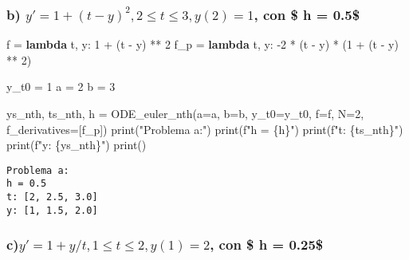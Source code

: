 \documentclass[
  letterpaper,
  DIV=11,
  numbers=noendperiod]{scrartcl}
\newenvironment{Shaded}{\begin{snugshade}}{\end{snugshade}}
\newcommand{\BuiltInTok}[1]{\textcolor[rgb]{0.00,0.23,0.31}{#1}}
\newcommand{\DecValTok}[1]{\textcolor[rgb]{0.68,0.00,0.00}{#1}}
\newcommand{\KeywordTok}[1]{\textcolor[rgb]{0.00,0.23,0.31}{\textbf{#1}}}
\newcommand{\NormalTok}[1]{\textcolor[rgb]{0.00,0.23,0.31}{#1}}
\newcommand{\OperatorTok}[1]{\textcolor[rgb]{0.37,0.37,0.37}{#1}}
\newcommand{\SpecialCharTok}[1]{\textcolor[rgb]{0.37,0.37,0.37}{#1}}
\newcommand{\SpecialStringTok}[1]{\textcolor[rgb]{0.13,0.47,0.30}{#1}}
\newcommand{\StringTok}[1]{\textcolor[rgb]{0.13,0.47,0.30}{#1}}
\begin{document}
\subsubsection{\texorpdfstring{b)
\(y' =1+(t-y)^2,2 \leq t \leq 3,  y(2) = 1\), con \$ h =
0.5\$}{b) y\textquotesingle{} =1+(t-y)\^{}2,2 \textbackslash leq t \textbackslash leq 3,  y(2) = 1, con \$ h = 0.5\$}}\label{b-y-1t-y22-leq-t-leq-3-y2-1-con-h-0.5}

\begin{Shaded}
\begin{Highlighting}[]
\NormalTok{f }\OperatorTok{=} \KeywordTok{lambda}\NormalTok{ t, y: }\DecValTok{1} \OperatorTok{+}\NormalTok{ (t }\OperatorTok{{-}}\NormalTok{ y) }\OperatorTok{**} \DecValTok{2}
\NormalTok{f\_p }\OperatorTok{=} \KeywordTok{lambda}\NormalTok{ t, y: }\OperatorTok{{-}}\DecValTok{2} \OperatorTok{*}\NormalTok{ (t }\OperatorTok{{-}}\NormalTok{ y) }\OperatorTok{*}\NormalTok{ (}\DecValTok{1} \OperatorTok{+}\NormalTok{ (t }\OperatorTok{{-}}\NormalTok{ y) }\OperatorTok{**} \DecValTok{2}\NormalTok{)}

\NormalTok{y\_t0 }\OperatorTok{=} \DecValTok{1}
\NormalTok{a }\OperatorTok{=} \DecValTok{2}
\NormalTok{b }\OperatorTok{=} \DecValTok{3}

\NormalTok{ys\_nth, ts\_nth, h }\OperatorTok{=}\NormalTok{ ODE\_euler\_nth(a}\OperatorTok{=}\NormalTok{a, b}\OperatorTok{=}\NormalTok{b, y\_t0}\OperatorTok{=}\NormalTok{y\_t0, f}\OperatorTok{=}\NormalTok{f, N}\OperatorTok{=}\DecValTok{2}\NormalTok{, f\_derivatives}\OperatorTok{=}\NormalTok{[f\_p])}
\BuiltInTok{print}\NormalTok{(}\StringTok{"Problema a:"}\NormalTok{)}
\BuiltInTok{print}\NormalTok{(}\SpecialStringTok{f"h = }\SpecialCharTok{\{}\NormalTok{h}\SpecialCharTok{\}}\SpecialStringTok{"}\NormalTok{)}
\BuiltInTok{print}\NormalTok{(}\SpecialStringTok{f"t: }\SpecialCharTok{\{}\NormalTok{ts\_nth}\SpecialCharTok{\}}\SpecialStringTok{"}\NormalTok{)}
\BuiltInTok{print}\NormalTok{(}\SpecialStringTok{f"y: }\SpecialCharTok{\{}\NormalTok{ys\_nth}\SpecialCharTok{\}}\SpecialStringTok{"}\NormalTok{)}
\BuiltInTok{print}\NormalTok{()}
\end{Highlighting}
\end{Shaded}

\begin{verbatim}
Problema a:
h = 0.5
t: [2, 2.5, 3.0]
y: [1, 1.5, 2.0]
\end{verbatim}

\subsubsection{\texorpdfstring{c)\(y' = 1+y/t, 1 \leq t \leq 2 ,  y(1) = 2\),
con \$ h =
0.25\$}{c)y\textquotesingle{} = 1+y/t, 1 \textbackslash leq t \textbackslash leq 2 ,  y(1) = 2, con \$ h = 0.25\$}}\label{cy-1yt-1-leq-t-leq-2-y1-2-con-h-0.25}
\end{document}

